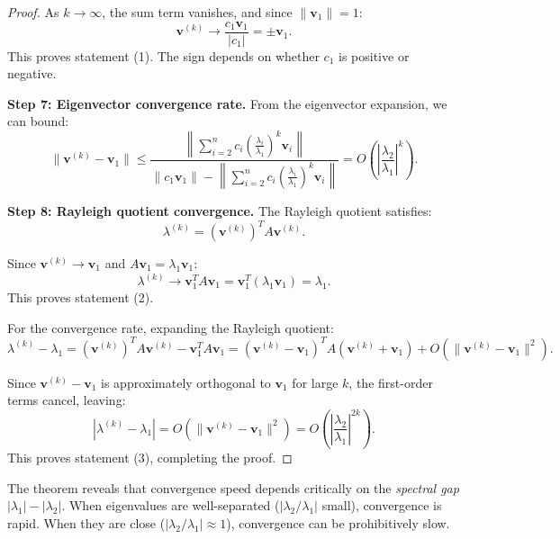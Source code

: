 \documentclass[11pt,a4paper]{article}
\begin{document}
\begin{proof}
As $k \to \infty$, the sum term vanishes, and since $\|\mathbf{v}_1\| = 1$:
\begin{equation}
\mathbf{v}^{(k)} \to \frac{c_1 \mathbf{v}_1}{|c_1|} = \pm \mathbf{v}_1.
\end{equation}
This proves statement (1). The sign depends on whether $c_1$ is positive or negative.

\textbf{Step 7: Eigenvector convergence rate.}
From the eigenvector expansion, we can bound:
\begin{equation}
\|\mathbf{v}^{(k)} - \mathbf{v}_1\| \leq \frac{\left\|\sum_{i=2}^n c_i \left(\frac{\lambda_i}{\lambda_1}\right)^k \mathbf{v}_i\right\|}{\|c_1 \mathbf{v}_1\| - \left\|\sum_{i=2}^n c_i \left(\frac{\lambda_i}{\lambda_1}\right)^k \mathbf{v}_i\right\|} = O\left(\left|\frac{\lambda_2}{\lambda_1}\right|^k\right).
\end{equation}

\textbf{Step 8: Rayleigh quotient convergence.}
The Rayleigh quotient satisfies:
\begin{equation}
\lambda^{(k)} = (\mathbf{v}^{(k)})^T A \mathbf{v}^{(k)}.
\end{equation}

Since $\mathbf{v}^{(k)} \to \mathbf{v}_1$ and $A\mathbf{v}_1 = \lambda_1 \mathbf{v}_1$:
\begin{equation}
\lambda^{(k)} \to \mathbf{v}_1^T A \mathbf{v}_1 = \mathbf{v}_1^T (\lambda_1 \mathbf{v}_1) = \lambda_1.
\end{equation}
This proves statement (2).

For the convergence rate, expanding the Rayleigh quotient:
\begin{equation}
\lambda^{(k)} - \lambda_1 = (\mathbf{v}^{(k)})^T A \mathbf{v}^{(k)} - \mathbf{v}_1^T A \mathbf{v}_1 = (\mathbf{v}^{(k)} - \mathbf{v}_1)^T A (\mathbf{v}^{(k)} + \mathbf{v}_1) + O(\|\mathbf{v}^{(k)} - \mathbf{v}_1\|^2).
\end{equation}

Since $\mathbf{v}^{(k)} - \mathbf{v}_1$ is approximately orthogonal to $\mathbf{v}_1$ for large $k$, the first-order terms cancel, leaving:
\begin{equation}
|\lambda^{(k)} - \lambda_1| = O(\|\mathbf{v}^{(k)} - \mathbf{v}_1\|^2) = O\left(\left|\frac{\lambda_2}{\lambda_1}\right|^{2k}\right).
\end{equation}
This proves statement (3), completing the proof.
\end{proof}

The theorem reveals that convergence speed depends critically on the \emph{spectral gap} $|\lambda_1| - |\lambda_2|$. When eigenvalues are well-separated ($|\lambda_2/\lambda_1|$ small), convergence is rapid. When they are close ($|\lambda_2/\lambda_1| \approx 1$), convergence can be prohibitively slow.
\end{document}
